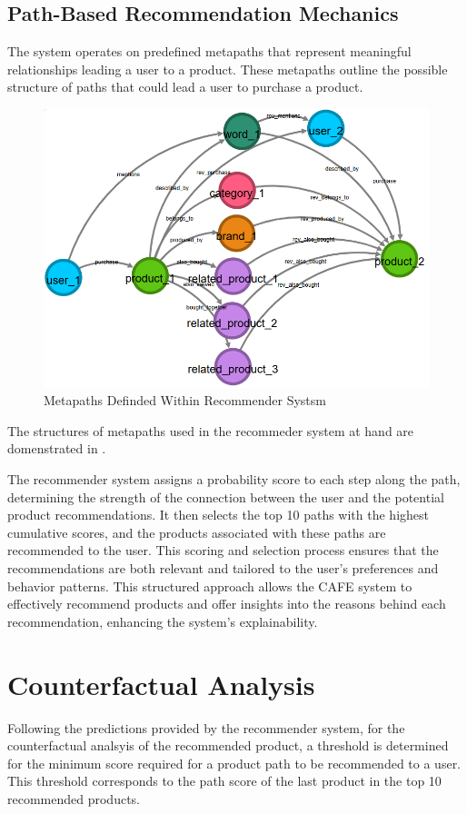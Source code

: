 \subsection{Path-Based Recommendation Mechanics}
The system operates on predefined metapaths that represent meaningful
relationships leading a user to a product. These metapaths outline the possible structure
of paths that could lead a user to purchase a product.
\begin{figure}[h!]
	\begin{center}
		\includegraphics[width=0.9\columnwidth, keepaspectratio]{
			images/metapaths.png
		}
		\caption{Metapaths Definded Within Recommender Systsm}
		\label{fig:metapaths}
	\end{center}
\end{figure}
The structures of metapaths used in the recommeder system at hand are domenstrated
in .

The recommender system assigns a probability score to each step along the path, determining
the strength of the connection between the user and the potential product recommendations.
It then selects the top 10 paths with the highest cumulative scores, and the products
associated with these paths are recommended to the user. This scoring and
selection process ensures that the recommendations are both relevant and
tailored to the user's preferences and behavior patterns. This structured approach
allows the CAFE system to effectively recommend products and offer insights into
the reasons behind each recommendation, enhancing the system's explainability.

\section{Counterfactual Analysis}
Following the predictions provided by the recommender system, for the counterfactual
analsyis of the recommended product, a threshold is determined for the minimum
score required for a product path to be recommended to a user. This threshold corresponds
to the path score of the last product in the top 10 recommended products.

